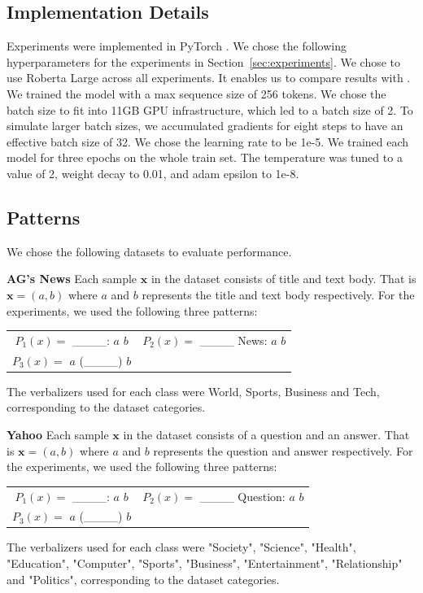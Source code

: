 \documentclass[11pt,a4paper]{article}
\begin{document}
\subsection{Implementation Details}
\label{apx:implementation-details}
Experiments were implemented in PyTorch \citep{NEURIPS2019_9015}.
We chose the following hyperparameters for the experiments in Section~\ref{sec:experiments}.
We chose to use Roberta Large across all experiments.
It enables us to compare results with \citet{schick2020exploiting}.
We trained the model with a max sequence size of 256 tokens.
We chose the batch size to fit into 11GB GPU infrastructure, which led to a batch size of 2. 
To simulate larger batch sizes, we accumulated gradients for eight steps to have an effective batch size of 32.
We chose the learning rate to be 1e-5.
We trained each model for three epochs on the whole train set.
The temperature was tuned to a value of 2, weight decay to 0.01, and adam epsilon to 1e-8.

\subsection{Patterns}
\label{apx:patterns}
We chose the following datasets to evaluate performance.

\vspace{8pt}
\noindent \textbf{AG's News} \quad
Each sample $\textbf{x}$ in the dataset consists of title and text body.
That is $\textbf{x}=(a, b)$ where $a$ and $b$ represents the title and text body respectively.
For the experiments, we used the following three patterns:
\begin{table}[H]
	\renewcommand{\arraystretch}{1.5}
	\begin{tabularx}{\textwidth}{cc}
		 $P_1(x)=$ \_\_\_\_: $a$ $b$ & $P_2(x)=$ \_\_\_\_ News: $a$ $b$ \\
		 $P_3(x)=$ $a$ (\_\_\_\_) $b$ &  \\
	\end{tabularx}
\end{table}
The verbalizers used for each class were World, Sports, Business and Tech, corresponding to the dataset categories.

\vspace{8pt}
\noindent \textbf{Yahoo} \quad
Each sample $\textbf{x}$ in the dataset consists of a question and an answer.
That is $\textbf{x}=(a, b)$ where $a$ and $b$ represents the question and answer respectively.
For the experiments, we used the following three patterns:
\begin{table}[H]
	\renewcommand{\arraystretch}{1.5}
	\begin{tabularx}{\textwidth}{cc}
		$P_1(x)=$ \_\_\_\_: $a$ $b$ & $P_2(x)=$ \_\_\_\_ Question: $a$ $b$ \\
		$P_3(x)=$ $a$ (\_\_\_\_) $b$ &  \\
	\end{tabularx}
\end{table}
The verbalizers used for each class were "Society", "Science", "Health", "Education", "Computer", "Sports", "Business", "Entertainment", "Relationship" and "Politics", corresponding to the dataset categories.
\end{document}
